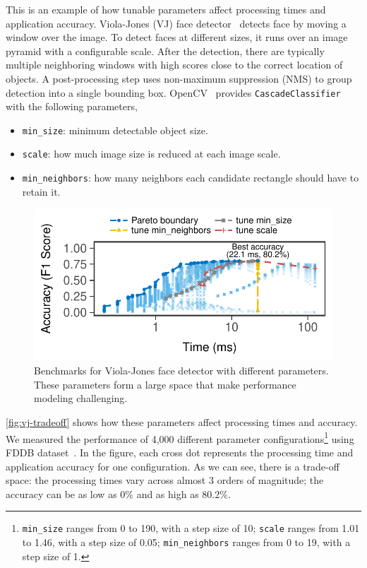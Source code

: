  This is an example of how tunable parameters
affect processing times and application accuracy. Viola-Jones (VJ) face
detector~\cite{viola2001rapid} detects face by moving a window over the image.
To detect faces at different sizes, it runs over an image pyramid with a
configurable scale. After the detection, there are typically multiple
neighboring windows with high scores close to the correct location of objects.
A post-processing step uses non-maximum suppression (NMS) to group detection
into a single bounding box. OpenCV~\cite{opencvlibrary} provides
\texttt{CascadeClassifier} with the following parameters,

\begin{itemize}[noitemsep, topsep=0pt]
\item \texttt{min\_size}: minimum detectable object size.
\item \texttt{scale}: how much image size is reduced at each image scale.
\item \texttt{min\_neighbors}: how many neighbors each candidate rectangle should
  have to retain it.
\end{itemize}

\begin{figure}[t]
  \centering
  \includegraphics[width=.8\columnwidth]{figures/exhaustive-face.pdf}
  \caption{Benchmarks for Viola-Jones face detector with different
    parameters. These parameters form a large space that make performance
    modeling challenging.}
  \label{fig:vj-tradeoff}
\end{figure}

\autoref{fig:vj-tradeoff} shows how these parameters affect processing times and
accuracy. We measured the performance of 4,000 different parameter
configurations\footnote{\texttt{min\_size} ranges from 0 to 190, with a step
  size of 10; \texttt{scale} ranges from 1.01 to 1.46, with a step size of 0.05;
  \texttt{min\_neighbors} ranges from 0 to 19, with a step size of 1.} using
FDDB dataset~\cite{jain2010fddb}. In the figure, each cross dot represents the
processing time and application accuracy for one configuration. As we can see,
there is a trade-off space: the processing times vary across almost 3 orders of
magnitude; the accuracy can be as low as 0\% and as high as 80.2\%.

